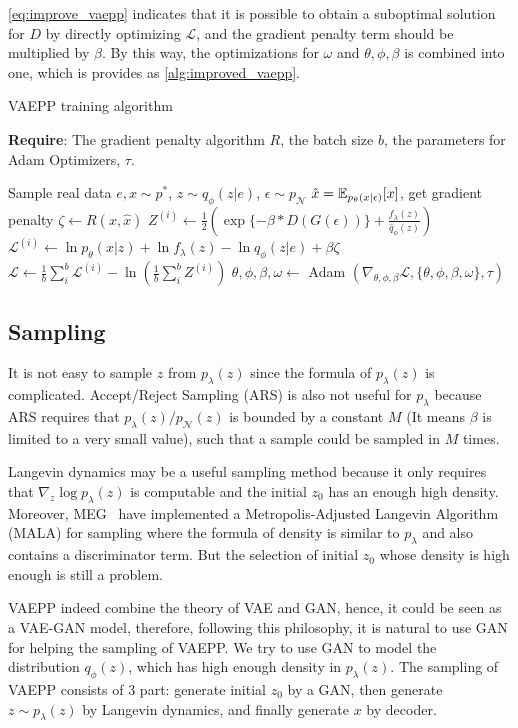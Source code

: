 \cref{eq:improve_vaepp} indicates that it is possible to obtain a suboptimal solution for $D$ by directly optimizing $\mathcal{L}$, and the gradient penalty term should be multiplied by $\beta$. By this way, the optimizations for $\omega$ and $\theta, \phi, \beta$ is combined into one, which is provides as \cref{alg:improved_vaepp}. 
\begin{algorithm}[tb]
\caption{VAEPP training algorithm}
\label{alg:improved_vaepp}
\textbf{Require}: The gradient penalty algorithm $R$, the batch size $b$, the parameters for Adam Optimizers, $\tau$. 

\begin{algorithmic}[1] %
\STATE Sample real data $e, x \sim p^*$, $z \sim q_\phi(z|e)$, $\epsilon \sim p_\mathcal{N}$
\STATE $\hat{x} = \operatorname{\mathbb{E}}_{p_\theta(x|\epsilon)}[x]$, get gradient penalty $\zeta \gets R(x, \hat{x})$ 
\STATE $Z^{(i)} \gets \frac{1}{2}(\exp\{-\beta * D(G(\epsilon))\} + \frac{f_\lambda(z)}{\hat{q}_\phi(z)})$
\STATE $\mathcal{L}^{(i)} \gets \ln p_\theta(x|z) + \ln f_\lambda(z) - \ln q_\phi(z|e) + \beta \zeta$
\ENDFOR
\STATE $\mathcal{L} \gets \frac{1}{b}\sum_{i}^b \mathcal{L}^{(i)} - \ln (\frac{1}{b}\sum_{i}^b Z^{(i)})$
\STATE $\theta, \phi, \beta, \omega \gets $ Adam $(\nabla_{\theta, \phi, \beta} \mathcal{L}, \{\theta, \phi, \beta, \omega\}, \tau)$
\ENDWHILE
\end{algorithmic}
\end{algorithm}

\subsection{Sampling}
It is not easy to sample $z$ from $p_\lambda(z)$ since the formula of $p_\lambda(z)$ is complicated. Accept/Reject Sampling (ARS) is also not useful for $p_\lambda$ because ARS requires that $p_\lambda(z) / p_\mathcal{N}(z)$ is bounded by a constant $M$ (It means $\beta$ is limited to a very small value), such that a sample could be sampled in $M$ times. 

Langevin dynamics may be a useful sampling method because it only requires that $\nabla_z \log p_\lambda(z)$ is computable and the initial $z_0$ has an enough high density. Moreover, MEG~\cite{kumar2019maximum} have implemented a Metropolis-Adjusted Langevin Algorithm (MALA) for sampling where the formula of density is similar to $p_\lambda$ and also contains a discriminator term. But the selection of initial $z_0$ whose density is high enough is still a problem. 

VAEPP indeed combine the theory of VAE and GAN, hence, it could be seen as a VAE-GAN model, therefore, following this philosophy, it is natural to use GAN for helping the sampling of VAEPP. We try to use GAN to model the distribution $q_\phi(z)$, which has high enough density in $p_\lambda(z)$. The sampling of VAEPP consists of 3 part: generate initial $z_0$ by a GAN, then generate $z \sim p_\lambda(z)$ by Langevin dynamics, and finally generate $x$ by decoder. 


 
 